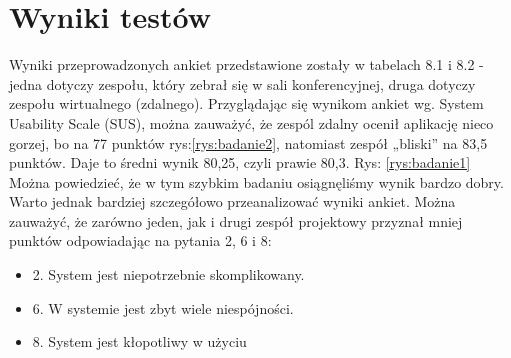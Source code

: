 \section{Wyniki testów}
Wyniki przeprowadzonych ankiet przedstawione zostały w tabelach 8.1 i 8.2 - jedna dotyczy zespołu,
który zebrał się w sali konferencyjnej, druga dotyczy zespołu wirtualnego (zdalnego).
Przyglądając się wynikom ankiet wg. System Usability Scale (SUS), można zauważyć, że zespól zdalny
ocenił aplikację nieco gorzej, bo na 77 punktów rys:\ref{rys:badanie2}, natomiast zespół „bliski” na 83,5 punktów. Daje to
średni wynik 80,25, czyli prawie 80,3. Rys: \ref{rys:badanie1}
Można powiedzieć, że w tym szybkim badaniu osiągnęliśmy wynik bardzo dobry. Warto jednak
bardziej szczegółowo przeanalizować wyniki ankiet. Można zauważyć, że zarówno jeden, jak i drugi
zespół projektowy przyznał mniej punktów odpowiadając na pytania 2, 6 i 8:
\begin{itemize}
	\item 2. System jest niepotrzebnie skomplikowany.
	\item 6. W systemie jest zbyt wiele niespójności.
	\item 8. System jest kłopotliwy w użyciu
\end{itemize} 

